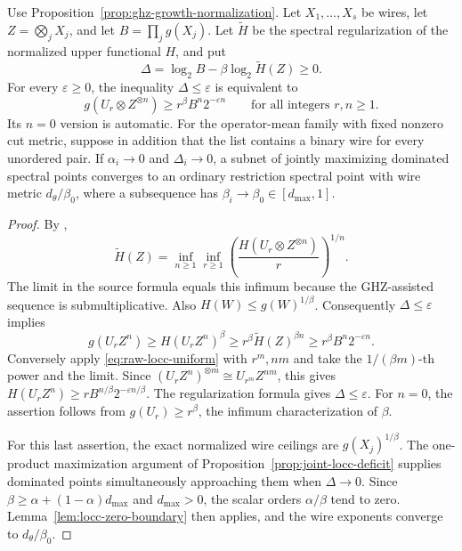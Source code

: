 \begin{proposition}\label{prop:raw-locc-deficit}
Use Proposition~\ref{prop:ghz-growth-normalization}.  Let \(X_1,\ldots,X_s\)
be wires, let \(Z=\bigotimes_jX_j\), and let \(B=\prod_jg(X_j)\).
Let \(\widetilde H\) be the spectral regularization of the normalized upper functional \(H\), and put
\[
 \Delta=\log_2 B-\beta\log_2\widetilde H(Z)\geq0.
\]
For every \(\varepsilon\geq0\), the inequality \(\Delta\leq\varepsilon\)
is equivalent to
\begin{equation}\label{eq:raw-locc-uniform}
 g(U_r\otimes Z^{\otimes n})
 \geq r^\beta B^n2^{-\varepsilon n}
 \qquad\text{for all integers }r,n\geq1.
\end{equation}
Its \(n=0\) version is automatic.
For the operator-mean family with fixed nonzero cut metric, suppose in
addition that the list contains a binary wire for every unordered pair.
If \(\alpha_i\to0\) and \(\Delta_i\to0\), a subnet of jointly maximizing
dominated spectral points converges to an ordinary restriction spectral
point with wire metric \(d_\theta/\beta_0\), where a subsequence has
\(\beta_i\to\beta_0\in[d_{\max},1]\).
\end{proposition}
\begin{proof}
By \cite[Proposition~3.15 and Theorem~3.23]{BugarVrana2025},
\[
 \widetilde H(Z)
 =\inf_{n\geq1}\inf_{r\geq1}
       \left(\frac{H(U_r\otimes Z^{\otimes n})}{r}\right)^{1/n}.
\]
The limit in the source formula equals this infimum because the
GHZ-assisted sequence is submultiplicative.
Also \(H(W)\leq g(W)^{1/\beta}\).
Consequently \(\Delta\leq\varepsilon\) implies
\[
 g(U_rZ^n)\geq H(U_rZ^n)^\beta
 \geq r^\beta\widetilde H(Z)^{\beta n}
 \geq r^\beta B^n2^{-\varepsilon n}.
\]
Conversely apply \eqref{eq:raw-locc-uniform} with \(r^m,nm\) and take the
\(1/(\beta m)\)-th power and the limit.  Since
\((U_rZ^n)^{\otimes m}\cong U_{r^m}Z^{nm}\), this gives
\(H(U_rZ^n)\geq rB^{n/\beta}2^{-\varepsilon n/\beta}\).
The regularization formula gives \(\Delta\leq\varepsilon\).
For \(n=0\), the assertion follows from
\(g(U_r)\geq r^\beta\), the infimum characterization of \(\beta\).

For this last assertion, the exact normalized wire ceilings are
\(g(X_j)^{1/\beta}\).
The one-product maximization argument of
Proposition~\ref{prop:joint-locc-deficit} supplies dominated points
simultaneously approaching them when \(\Delta\to0\).
Since \(\beta\geq\alpha+(1-\alpha)d_{\max}\) and \(d_{\max}>0\),
the scalar orders \(\alpha/\beta\) tend to zero.
Lemma~\ref{lem:locc-zero-boundary} then applies, and the wire exponents
converge to \(d_\theta/\beta_0\).
\end{proof}

